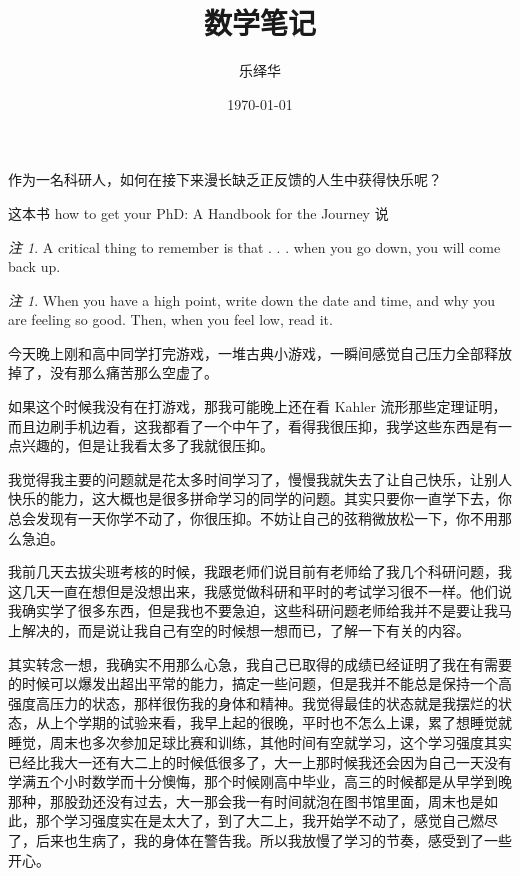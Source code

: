 \documentclass{ctexart}
\author{乐绎华}
\title{数学笔记}
\date{\today}
\theoremstyle{plain}
\theoremstyle{definition}
\theoremstyle{remark}
\newtheorem{note}[theorem]{注}
\begin{document}
\maketitle
\tableofcontents

作为一名科研人，如何在接下来漫长缺乏正反馈的人生中获得快乐呢？

这本书 how to get your PhD: A Handbook for the Journey 说

\begin{note}
A critical thing to remember is that . . . when you go down, you will come back up.
\end{note}
\begin{note}
When you have a high point, write down the date and time, and why you are feeling so good. Then, when you feel low, read it.
\end{note}
今天晚上刚和高中同学打完游戏，一堆古典小游戏，一瞬间感觉自己压力全部释放掉了，没有那么痛苦那么空虚了。

如果这个时候我没有在打游戏，那我可能晚上还在看 Kahler 流形那些定理证明，而且边刷手机边看，这我都看了一个中午了，看得我很压抑，我学这些东西是有一点兴趣的，但是让我看太多了我就很压抑。

我觉得我主要的问题就是花太多时间学习了，慢慢我就失去了让自己快乐，让别人快乐的能力，这大概也是很多拼命学习的同学的问题。其实只要你一直学下去，你总会发现有一天你学不动了，你很压抑。不妨让自己的弦稍微放松一下，你不用那么急迫。

我前几天去拔尖班考核的时候，我跟老师们说目前有老师给了我几个科研问题，我这几天一直在想但是没想出来，我感觉做科研和平时的考试学习很不一样。他们说我确实学了很多东西，但是我也不要急迫，这些科研问题老师给我并不是要让我马上解决的，而是说让我自己有空的时候想一想而已，了解一下有关的内容。

其实转念一想，我确实不用那么心急，我自己已取得的成绩已经证明了我在有需要的时候可以爆发出超出平常的能力，搞定一些问题，但是我并不能总是保持一个高强度高压力的状态，那样很伤我的身体和精神。我觉得最佳的状态就是我摆烂的状态，从上个学期的试验来看，我早上起的很晚，平时也不怎么上课，累了想睡觉就睡觉，周末也多次参加足球比赛和训练，其他时间有空就学习，这个学习强度其实已经比我大一还有大二上的时候低很多了，大一上那时候我还会因为自己一天没有学满五个小时数学而十分懊悔，那个时候刚高中毕业，高三的时候都是从早学到晚那种，那股劲还没有过去，大一那会我一有时间就泡在图书馆里面，周末也是如此，那个学习强度实在是太大了，到了大二上，我开始学不动了，感觉自己燃尽了，后来也生病了，我的身体在警告我。所以我放慢了学习的节奏，感受到了一些开心。
\end{document}
